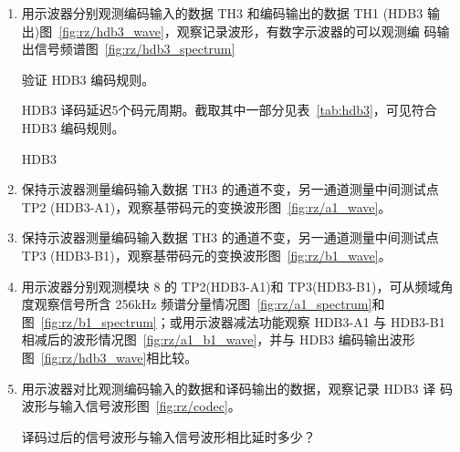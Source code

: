 \documentclass[../main]{subfiles}
\begin{document}
\begin{enumerate}
  \item 用示波器分别观测编码输入的数据 TH3 和编码输出的数据 TH1 (HDB3 输
    出)图~\ref{fig:rz/hdb3_wave}，观察记录波形，有数字示波器的可以观测编
    码输出信号频谱图~\ref{fig:rz/hdb3_spectrum}

    \begin{Exercise}[title = 思考]
      验证 HDB3 编码规则。
    \end{Exercise}

    \begin{Answer}
      HDB3 译码延迟5个码元周期。截取其中一部分见表~\ref{tab:hdb3}，可见符合
      HDB3 编码规则。
    \end{Answer}

    \begin{table}[htbp]
      \centering
      \caption{HDB3}%
      \label{tab:hdb3}
    \end{table}

  \item 保持示波器测量编码输入数据 TH3 的通道不变，另一通道测量中间测试点
    TP2 (HDB3-A1)，观察基带码元的变换波形图~\ref{fig:rz/a1_wave}。
  \item 保持示波器测量编码输入数据 TH3 的通道不变，另一通道测量中间测试点
    TP3 (HDB3-B1)，观察基带码元的变换波形图~\ref{fig:rz/b1_wave}。
  \item 用示波器分别观测模块 8 的 TP2(HDB3-A1)和 TP3(HDB3-B1)，可从频域角
    度观察信号所含 256kHz 频谱分量情况图~\ref{fig:rz/a1_spectrum}和
    图~\ref{fig:rz/b1_spectrum}；或用示波器减法功能观察 HDB3-A1 与
    HDB3-B1 相减后的波形情况图~\ref{fig:rz/a1_b1_wave}，并与 HDB3 编码输出波形
    图~\ref{fig:rz/hdb3_wave}相比较。
  \item 用示波器对比观测编码输入的数据和译码输出的数据，观察记录 HDB3 译
    码波形与输入信号波形图~\ref{fig:rz/codec}。

    \begin{Exercise}[title = 思考]
      译码过后的信号波形与输入信号波形相比延时多少？
    \end{Exercise}


\end{enumerate}
\end{document}
